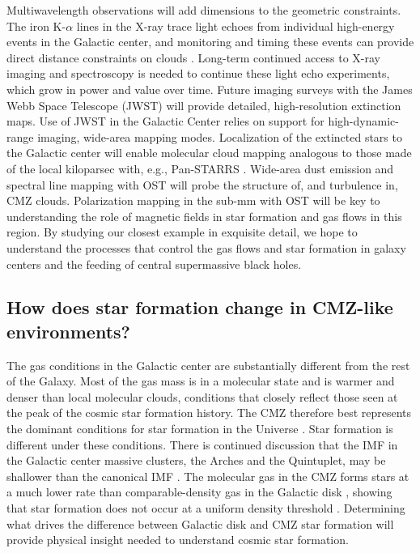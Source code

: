 \documentclass[modern]{aastex62}
\begin{document}
Multiwavelength observations will add dimensions to the geometric constraints.
The iron K-$\alpha$ lines in the X-ray trace light echoes from individual
high-energy events in the Galactic center, and monitoring and timing these
events can provide direct distance constraints on clouds
\citep[e.g.,][]{Clavel2014a,Churazov2017b,Churazov2017a,Terrier2018a}.
Long-term continued access to X-ray imaging and spectroscopy is needed to
continue these light echo experiments, which grow in power and value over time.
Future imaging surveys with the James Webb Space Telescope (JWST) will provide
detailed, high-resolution extinction maps.  Use of JWST in the Galactic Center
relies on support for high-dynamic-range imaging, wide-area mapping modes.
Localization of the extincted stars to the Galactic center will enable
molecular cloud mapping analogous to those made of the local kiloparsec with,
e.g., Pan-STARRS \citep{Green2015b}.  Wide-area dust emission and spectral line
mapping with OST will probe the structure of, and turbulence in, CMZ clouds.
Polarization mapping in the sub-mm with OST will be key to understanding the
role of magnetic fields in star formation and gas flows in this region.
By studying our closest example in exquisite detail, we hope to understand the
processes that control the gas flows and star formation in galaxy centers and
the feeding of central supermassive black holes.

\subsection{How does star formation change in CMZ-like environments?}
The gas conditions in the Galactic center are substantially different from the
rest of the Galaxy.  Most of the gas mass is in a molecular state
\citep[][]{Kennicutt2012a,Mills2017a} and is warmer and denser than local
molecular clouds, conditions that closely reflect those seen at the peak of the
cosmic star formation history.  The CMZ therefore best represents the dominant
conditions for star formation in the Universe \citep{Kruijssen2013a}.  Star
formation is different under these conditions.  There is continued discussion
that the IMF in the Galactic center massive clusters, the Arches and the
Quintuplet, may be shallower than the canonical IMF \citep{Hosek2019a}. The
molecular gas in the CMZ forms stars at a much lower rate than
comparable-density gas in the Galactic disk \citep{Longmore2013b}, showing that
star formation does not occur at a uniform density threshold
\citep{Rathborne2014b,Kruijssen2014c,Walker2018a,Barnes2017b,Ginsburg2018a}.
Determining what drives the difference between Galactic disk and CMZ
star formation will provide physical insight needed to understand
cosmic star formation.
\end{document}
